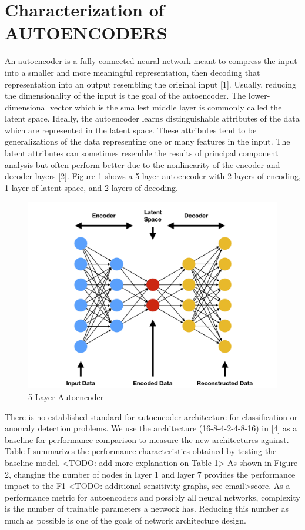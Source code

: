 \documentclass[conference]{IEEEtran}
\begin{document}
\section{Characterization of AUTOENCODERS}
An autoencoder is a fully connected neural network meant to compress the input into a smaller and more meaningful representation, then decoding that representation into an output resembling the original input [1]. Usually, reducing the dimensionality of the input is the goal of the autoencoder. The lower-dimensional vector which is the smallest middle layer is commonly called the latent space. Ideally, the autoencoder learns distinguishable attributes of the data which are represented in the latent space. These attributes tend to be generalizations of the data representing one or many features in the input. The latent attributes can sometimes resemble the results of principal component analysis but often perform better due to the nonlinearity of the encoder and decoder layers [2]. Figure 1 shows a 5 layer autoencoder with 2 layers of encoding, 1 layer of latent space, and 2 layers of decoding.

\begin{figure}
    \includegraphics[width=\linewidth]{ae_5_layer.png}
    \caption{5 Layer Autoencoder}
    \label{fig:ae_5_layer}
\end{figure}

There is no established standard for autoencoder architecture for classification or anomaly detection problems. We use the architecture (16-8-4-2-4-8-16) in [4] as a baseline for performance comparison to measure the new architectures against. Table I summarizes the performance characteristics obtained by testing the baseline model. <TODO: add more explanation on Table 1> As shown in Figure 2, changing the number of nodes in layer 1 and layer 7 provides the performance impact to the F1 <TODO: additional sensitivity graphs, see email>score. As a performance metric for autoencoders and possibly all neural networks, complexity is the number of trainable parameters a network has. Reducing this number as much as possible is one of the goals of network architecture design.
\end{document}
